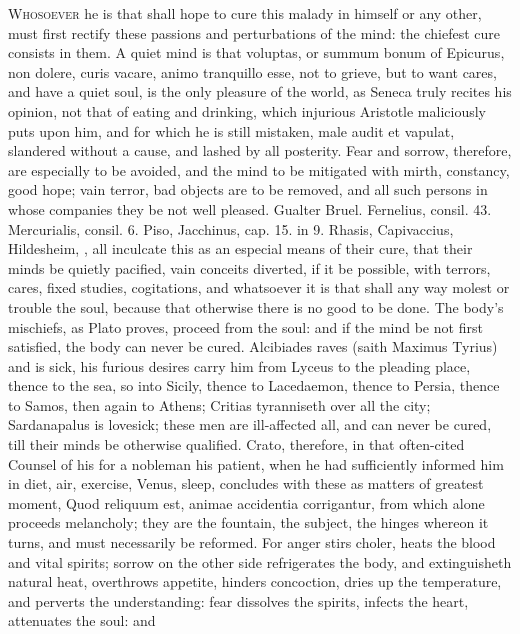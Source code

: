 {\lettrine{W}{hosoever} he is that shall hope to cure this malady in himself or any
other, must first rectify these passions and perturbations of the mind:
the chiefest cure consists in them. A quiet mind is that voluptas, or
summum bonum of Epicurus, non dolere, curis vacare, animo tranquillo
esse, not to grieve, but to want cares, and have a quiet soul, is the
only pleasure of the world, as Seneca truly recites his opinion, not
that of eating and drinking, which injurious Aristotle maliciously puts
upon him, and for which he is still mistaken, male audit et vapulat,
slandered without a cause, and lashed by all posterity. Fear and
sorrow, therefore, are especially to be avoided, and the mind to be
mitigated with mirth, constancy, good hope; vain terror, bad objects
are to be removed, and all such persons in whose companies they be not
well pleased. Gualter Bruel. Fernelius, consil. 43. Mercurialis,
consil. 6. Piso, Jacchinus, cap. 15. in 9. Rhasis, Capivaccius,
Hildesheim, \etc{}, all inculcate this as an especial means of their cure,
that their minds be quietly pacified, vain conceits diverted, if
it be possible, with terrors, cares,  fixed studies, cogitations,
and whatsoever it is that shall any way molest or trouble the soul,
because that otherwise there is no good to be done. The body's
mischiefs, as Plato proves, proceed from the soul: and if the mind be
not first satisfied, the body can never be cured. Alcibiades raves
(saith Maximus Tyrius) and is sick, his furious desires carry him
from Lyceus to the pleading place, thence to the sea, so into Sicily,
thence to Lacedaemon, thence to Persia, thence to Samos, then again to
Athens; Critias tyranniseth over all the city; Sardanapalus is
lovesick; these men are ill-affected all, and can never be cured, till
their minds be otherwise qualified. Crato, therefore, in that
often-cited Counsel of his for a nobleman his patient, when he had
sufficiently informed him in diet, air, exercise, Venus, sleep,
concludes with these as matters of greatest moment, Quod reliquum est,
animae accidentia corrigantur, from which alone proceeds melancholy;
they are the fountain, the subject, the hinges whereon it turns, and
must necessarily be reformed. For anger stirs choler, heats the
blood and vital spirits; sorrow on the other side refrigerates the
body, and extinguisheth natural heat, overthrows appetite, hinders
concoction, dries up the temperature, and perverts the understanding:
fear dissolves the spirits, infects the heart, attenuates the soul: and
}
